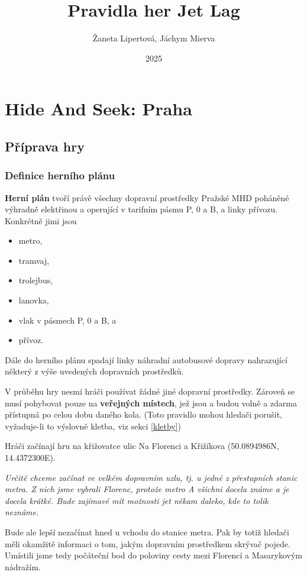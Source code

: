 \documentclass{book}
\title{Pravidla her Jet Lag}
\author{Žaneta Lipertová, Jáchym Mierva}
\date{2025}
\newenvironment{reasoning}{\begin{small}\itshape}{\end{small}}
\begin{document}
\maketitle
\tableofcontents

\chapter{Hide And Seek: Praha}

\section{Příprava hry}

\subsection{Definice herního plánu}\label{herní plán}

\textbf{Herní plán} tvoří právě všechny dopravní prostředky Pražské MHD poháněné výhradně elektřinou a operující v tarifním pásmu P, 0 a B, a linky přívozu. Konkrétně jimi jsou
\begin{itemize}
	\item metro,
	\item tramvaj,
	\item trolejbus,
	\item lanovka,
	\item vlak v pásmech P, 0 a B, a
	\item přívoz.
\end{itemize}
Dále do herního plánu spadají linky náhradní autobusové dopravy nahrazující některý z výše uvedených dopravních prostředků.

V průběhu hry nesmí hráči používat žádné jiné dopravní prostředky. Zároveň se musí pohybovat pouze na \textbf{veřejných místech}, jež jsou a budou volně a zdarma přístupná po celou dobu daného kola. (Toto pravidlo mohou hledači porušit, vyžaduje-li to výslovně kletba, viz sekci \ref{kletby})

Hráči začínají hru na křižovatce ulic Na Florenci a Křižíkova (50.0894986N, 14.4372300E).

\begin{reasoning}
	Určitě chceme začínat ve velkém dopravním uzlu, tj. u jedné z přestupních stanic metra. Z nich jsme vybrali Florenc, protože metro A všichni docela známe a je docela krátké. Bude zajímavé mít možnosti jet někam daleko, kde to tolik neznáme.

	Bude ale lepší nezačínat hned u vchodu do stanice metra. Pak by totiž hledači měli okamžitě informaci o tom, jakým dopravním prostředkem skrývač pojede. Umístili jsme tedy počáteční bod do poloviny cesty mezi Florencí a Masarykovým nádražím.
\end{reasoning}
\end{document}

